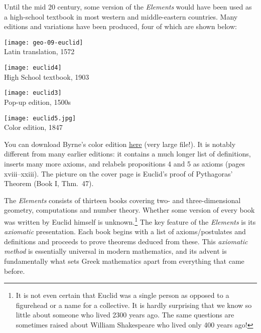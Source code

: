 Until the mid 20\th{} century, some version of the \emph{Elements} would have been used as a high-school textbook in most western and middle-eastern countries. Many editions and variations have been produced, four of which are shown below:
\begin{center}
	\begin{minipage}[b]{0.683\linewidth}\vspace{0pt}
		\centering
		\texttt{[image: geo-09-euclid]}\\
		Latin translation, 1572
	\end{minipage}%
	\begin{minipage}[b]{0.317\linewidth}\vspace{0pt}
		\centering\texttt{[image: euclid4]}\\
		High School textbook, 1903
	\end{minipage}%
	\smallbreak
	\begin{minipage}[b]{0.67\linewidth}\vspace{0pt}
		\centering\texttt{[image: euclid3]}\\
		Pop-up edition, 1500s
	\end{minipage}%
	\begin{minipage}[b]{0.33\linewidth}\vspace{0pt}
		\centering\texttt{[image: euclid5.jpg]}\\
		Color edition, 1847
	\end{minipage}
\end{center}

You can download Byrne's color edition \href{http://math.uci.edu/~ndonalds/Elements-I-VI.pdf}{here} (very large file!). It is notably different from many earlier editions: it contains a much longer list of definitions, inserts many more axioms, and relabels propositions 4 and 5 as axioms (pages xviii--xxiii). The picture on the cover page is Euclid's proof of Pythagoras' Theorem (Book I, Thm.\ 47).
\goodbreak



The \emph{Elements} consists of thirteen books covering two- and three-dimensional geometry, computations and number theory. Whether some version of every book was written by Euclid himself is unknown.\footnote{It is not even certain that Euclid was a single person as opposed to a figurehead or a name for a collective. It is hardly surprising that we know so little about someone who lived 2300 years ago. The same questions are sometimes raised about William Shakespeare who lived only 400 years ago!} The key feature of the \emph{Elements} is its \emph{axiomatic} presentation. Each book begins with a list of axioms/postulates and definitions and proceeds to prove theorems deduced from these. This \emph{axiomatic method} is essentially universal in modern mathematics, and its advent is fundamentally what sets Greek mathematics apart from everything that came before.\smallbreak

